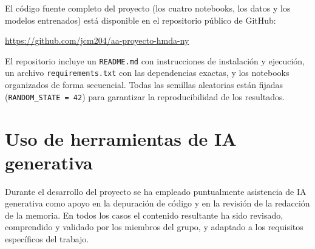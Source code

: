 \documentclass[11pt,a4paper]{article}
\begin{document}
El código fuente completo del proyecto (los cuatro notebooks, los datos y los modelos entrenados)
está disponible en el repositorio público de GitHub:

\begin{center}
\url{https://github.com/jcm204/aa-proyecto-hmda-ny}
\end{center}

\noindent El repositorio incluye un \texttt{README.md} con instrucciones de instalación y ejecución,
un archivo \texttt{requirements.txt} con las dependencias exactas, y los notebooks organizados de
forma secuencial. Todas las semillas aleatorias están fijadas (\texttt{RANDOM\_STATE = 42}) para
garantizar la reproducibilidad de los resultados.

\section{Uso de herramientas de IA generativa}
 
Durante el desarrollo del proyecto se ha empleado puntualmente asistencia de IA generativa como
apoyo en la depuración de código y en la revisión de la redacción de la memoria. En todos los casos
el contenido resultante ha sido revisado, comprendido y validado por los miembros del grupo, y
adaptado a los requisitos específicos del trabajo.
\end{document}
